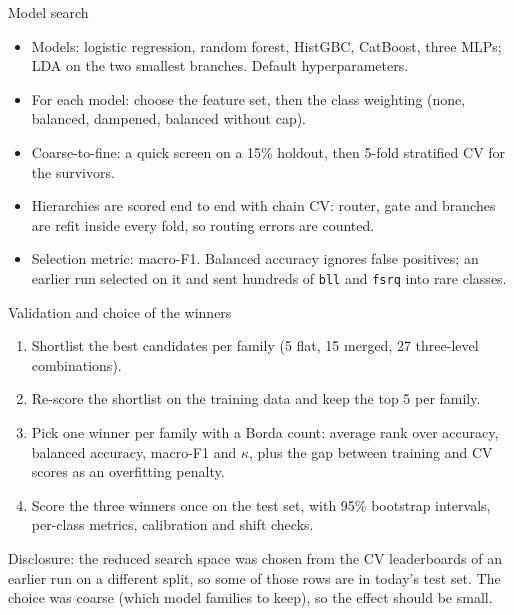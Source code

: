 \documentclass[aspectratio=169, 10pt]{beamer}
\newcommand{\cls}[1]{\texttt{#1}}
\begin{document}
\begin{frame}{Model search}
  \begin{itemize}\small
    \item Models: logistic regression, random forest, HistGBC, CatBoost, three MLPs; LDA on the
          two smallest branches. Default hyperparameters.
    \item For each model: choose the feature set, then the class weighting (none, balanced,
          dampened, balanced without cap).
    \item Coarse-to-fine: a quick screen on a 15\% holdout, then 5-fold stratified CV for the
          survivors.
    \item Hierarchies are scored end to end with chain CV: router, gate and branches are refit
          inside every fold, so routing errors are counted.
    \item Selection metric: macro-F1. Balanced accuracy ignores false positives; an earlier run
          selected on it and sent hundreds of \cls{bll} and \cls{fsrq} into rare classes.
  \end{itemize}
\end{frame}

\begin{frame}{Validation and choice of the winners}
  \begin{enumerate}\small
    \item Shortlist the best candidates per family (5 flat, 15 merged, 27 three-level
          combinations).
    \item Re-score the shortlist on the training data and keep the top 5 per family.
    \item Pick one winner per family with a Borda count: average rank over accuracy, balanced
          accuracy, macro-F1 and \(\kappa\), plus the gap between training and CV scores as an
          overfitting penalty.
    \item Score the three winners once on the test set, with 95\% bootstrap intervals,
          per-class metrics, calibration and shift checks.
  \end{enumerate}
  \vspace{0.2cm}
  \small Disclosure: the reduced search space was chosen from the CV leaderboards of an earlier
  run on a different split, so some of those rows are in today's test set. The choice was coarse
  (which model families to keep), so the effect should be small.
\end{frame}

\end{document}
